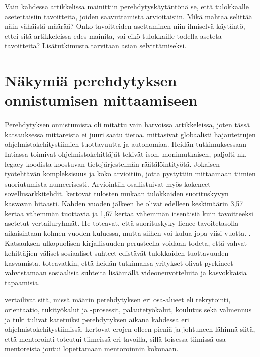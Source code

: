 \documentclass[utf8]{gradu3}
\begin{document}
Vain kahdessa artikkelissa mainittiin perehdytyskäytäntönä se, että tulokkaalle asetettaisiin tavoitteita, joiden saavuttamista arvioitaisiin. Mikä mahtaa selittää näin vähäistä määrää? Onko tavoitteiden asettaminen niin ilmiselvä käytäntö, ettei sitä artikkeleissa edes mainita, vai eikö tulokkaille todella aseteta tavoitteita? Lisätutkimusta tarvitaan asian selvittämiseksi.

\section{Näkymiä perehdytyksen onnistumisen mittaamiseen}

Perehdytyksen onnistumista oli mitattu vain harvoissa artikkeleissa, joten tässä katsauksessa mittareista ei juuri saatu tietoa. \textcite{britto-ym-2020} mittasivat globaalisti hajautettujen ohjelmistokehitystiimien tuottavuutta ja autonomiaa. Heidän tutkimuksessaan Intiassa toimivat ohjelmistokehittäjät tekivät ison, monimutkaisen, paljolti nk. legacy-koodista koostuvan tietojärjestelmän räätälöintityötä. Jokaisen työtehtävän kompleksisuus ja koko arvioitiin, jotta pystyttiin mittaamaan tiimien suoriutumista numeerisesti. Arviointiin osallistuivat myös kokeneet sovellusarkkitehdit. \textcite{britto-ym-2020} kertovat tulosten mukaan tulokkaiden suorituskyvyn kasvavan hitaasti. Kahden vuoden jälkeen he olivat edelleen keskimäärin 3,57 kertaa vähemmän tuottavia ja 1,67 kertaa vähemmän itsenäisiä kuin tavoitteeksi asetetut vertailuryhmät. He toteavat, että suorituskyky lienee tavoitetasolla aikaisintaan kolmen vuoden kuluessa, mutta siihen voi kulua jopa viisi vuotta. \parencite{britto-ym-2020}. Katsauksen ulkopuolisen kirjallisuuden perusteella \parencite{casalnuovo-ym-2015} voidaan todeta, että vahvat kehittäjien väliset sosiaaliset suhteet edistävät tulokkaiden tuottavuuden kasvamista. \textcite{britto-ym-2017} toteavatkin, että heidän tutkimansa yritykset olivat pyrkineet vahvistamaan sosiaalisia suhteita lisäämällä videoneuvotteluita ja kasvokkaisia tapaamisia. 

\textcite{moe-ym-2020} vertailivat sitä, missä määrin perehdytyksen eri osa-alueet %
\parencite%
    [][mukaan]{bauer-2010}%
\relax
 eli rekrytointi, orientaatio, tukityökalut ja -prosessit, palautetyökalut, koulutus sekä valmennus ja tuki tulivat katetuiksi perehdytyksen aikana kahdessa eri ohjelmistokehitystiimissä. \textcite{moe-ym-2020} kertovat erojen olleen pieniä ja johtuneen lähinnä siitä, että mentorointi toteutui tiimeissä eri tavoilla, sillä toisessa tiimissä osa mentoreista joutui lopettamaan mentoroinnin kokonaan. 
\end{document}
